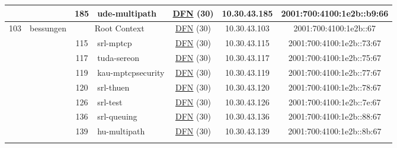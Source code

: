 \begin{small}
\begin{center}
\begin{longtable}{|c|c|c|c|c|c|c|c|}
  &  & \tiny{185} & \multicolumn{1}{|l|}{\tiny{ude-multipath}} & \multicolumn{2}{|c|}{\tiny{\href{https://www.dfn.de}{DFN} (30)}} & \tiny{10.30.43.185} & \tiny{2001:700:4100:1e2b::b9:66} \\ \hline
 \multirow{18}{*}{\tiny{103}} & \multicolumn{1}{|l|}{\multirow{18}{*}{\tiny{bessungen}}} & \multicolumn{2}{|c|}{\tiny{Root Context}} & \multicolumn{2}{|c|}{\tiny{\href{https://www.dfn.de}{DFN} (30)}} & \tiny{10.30.43.103} & \tiny{2001:700:4100:1e2b::67} \\* \cline{3-3}\cline{4-4}\cline{5-5}\cline{6-6}\cline{7-7}\cline{8-8}
  &  & \tiny{115} & \multicolumn{1}{|l|}{\tiny{srl-mptcp}} & \multicolumn{2}{|c|}{\tiny{\href{https://www.dfn.de}{DFN} (30)}} & \tiny{10.30.43.115} & \tiny{2001:700:4100:1e2b::73:67} \\* \cline{3-3}\cline{4-4}\cline{5-5}\cline{6-6}\cline{7-7}\cline{8-8}
  &  & \tiny{117} & \multicolumn{1}{|l|}{\tiny{tuda-sereon}} & \multicolumn{2}{|c|}{\tiny{\href{https://www.dfn.de}{DFN} (30)}} & \tiny{10.30.43.117} & \tiny{2001:700:4100:1e2b::75:67} \\* \cline{3-3}\cline{4-4}\cline{5-5}\cline{6-6}\cline{7-7}\cline{8-8}
  &  & \tiny{119} & \multicolumn{1}{|l|}{\tiny{kau-mptcpsecurity}} & \multicolumn{2}{|c|}{\tiny{\href{https://www.dfn.de}{DFN} (30)}} & \tiny{10.30.43.119} & \tiny{2001:700:4100:1e2b::77:67} \\* \cline{3-3}\cline{4-4}\cline{5-5}\cline{6-6}\cline{7-7}\cline{8-8}
  &  & \tiny{120} & \multicolumn{1}{|l|}{\tiny{srl-thuen}} & \multicolumn{2}{|c|}{\tiny{\href{https://www.dfn.de}{DFN} (30)}} & \tiny{10.30.43.120} & \tiny{2001:700:4100:1e2b::78:67} \\* \cline{3-3}\cline{4-4}\cline{5-5}\cline{6-6}\cline{7-7}\cline{8-8}
  &  & \tiny{126} & \multicolumn{1}{|l|}{\tiny{srl-test}} & \multicolumn{2}{|c|}{\tiny{\href{https://www.dfn.de}{DFN} (30)}} & \tiny{10.30.43.126} & \tiny{2001:700:4100:1e2b::7e:67} \\* \cline{3-3}\cline{4-4}\cline{5-5}\cline{6-6}\cline{7-7}\cline{8-8}
  &  & \tiny{136} & \multicolumn{1}{|l|}{\tiny{srl-queuing}} & \multicolumn{2}{|c|}{\tiny{\href{https://www.dfn.de}{DFN} (30)}} & \tiny{10.30.43.136} & \tiny{2001:700:4100:1e2b::88:67} \\* \cline{3-3}\cline{4-4}\cline{5-5}\cline{6-6}\cline{7-7}\cline{8-8}
  &  & \tiny{139} & \multicolumn{1}{|l|}{\tiny{hu-multipath}} & \multicolumn{2}{|c|}{\tiny{\href{https://www.dfn.de}{DFN} (30)}} & \tiny{10.30.43.139} & \tiny{2001:700:4100:1e2b::8b:67} \\* \cline{3-3}\cline{4-4}\cline{5-5}\cline{6-6}\cline{7-7}\cline{8-8}

\end{longtable}
\end{center}
\end{small}
